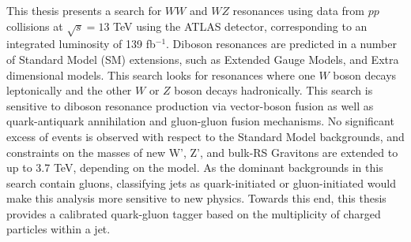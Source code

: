 This thesis presents a search for $WW$ and $WZ$ resonances using data from $pp$ collisions at $\sqrt{s}=13$ TeV using the ATLAS detector, corresponding to an integrated luminosity of 139 fb$^{-1}$. Diboson resonances are predicted in a number of Standard Model (SM) extensions, such as Extended Gauge Models, and Extra dimensional models. This search looks for resonances where one $W$ boson decays leptonically and the other $W$ or $Z$ boson decays hadronically. This search is sensitive to diboson resonance production via vector-boson fusion as well as quark-antiquark annihilation and gluon-gluon fusion mechanisms. No significant excess of events is observed with respect to the Standard Model backgrounds, and constraints on the masses of new W', Z', and bulk-RS Gravitons are extended to up to 3.7 TeV, depending on the model. As the dominant backgrounds in this search contain gluons, classifying jets as quark-initiated or gluon-initiated would make this analysis more sensitive to new physics. Towards this end, this thesis provides a calibrated quark-gluon tagger based on the multiplicity of charged particles within a jet.